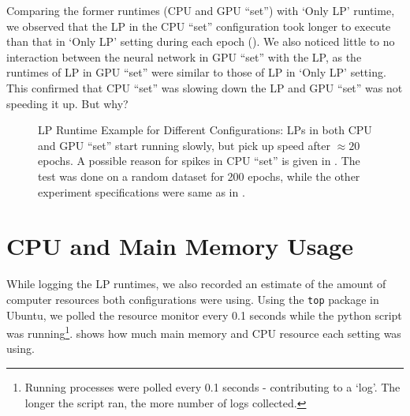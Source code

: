 Comparing the former runtimes (CPU and GPU ``set'') with `Only LP' runtime, we observed that the LP in the CPU ``set'' configuration took longer to execute than that in `Only LP' setting during each epoch (). We also noticed little to no interaction between the neural network in GPU ``set'' with the LP, as the runtimes of LP in GPU ``set'' were similar to those of LP in `Only LP' setting. This confirmed that CPU ``set'' was slowing down the LP and GPU ``set'' was not speeding it up. But why?
\begin{figure}[!htbp]
    \centering
    \caption[LP Runtime Example for Different Configurations]{LP Runtime Example for Different Configurations: LPs in both CPU and GPU ``set'' start running slowly, but pick up speed after $\approx 20$ epochs. A possible reason for spikes in CPU ``set'' is given in . The test was done on a random dataset for 200 epochs, while the other experiment specifications were same as in .}
    \label{fig:LP Runtime Example for Different Configurations}
\end{figure}

\section{CPU and Main Memory Usage} \label{app:CPU and Main Memory Usage}
While logging the LP runtimes, we also recorded an estimate of the amount of computer resources both configurations were using. Using the \texttt{top} package in Ubuntu, we polled the resource monitor every 0.1 seconds while the python script was running\footnote{\label{foo:logs not epochs} Running processes were polled every 0.1 seconds - contributing to a `log'. The longer the script ran, the more number of logs collected.}.  shows how much main memory and CPU resource each setting was using.

